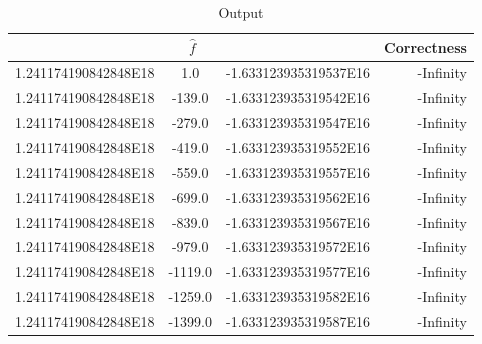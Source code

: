 \documentclass{article}
\begin{document}
\begin{enumerate}
		\begin{table}[h]
				\caption{Output} 
				\centering
				\begin{tabular}{ ccc r}
					\hline
					\multicolumn{3}{c}{$\hat{f}$} & Correctness \\
					\hline
										{1.241174190842848E18} & {1.0} & {-1.633123935319537E16} & {-Infinity}\\
										{1.241174190842848E18} & {-139.0} & {-1.633123935319542E16} & {-Infinity}\\
										{1.241174190842848E18} & {-279.0} & {-1.633123935319547E16} & {-Infinity}\\
										{1.241174190842848E18} & {-419.0} & {-1.633123935319552E16} & {-Infinity}\\
										{1.241174190842848E18} & {-559.0} & {-1.633123935319557E16} & {-Infinity}\\
										{1.241174190842848E18} & {-699.0} & {-1.633123935319562E16} & {-Infinity}\\
										{1.241174190842848E18} & {-839.0} & {-1.633123935319567E16} & {-Infinity}\\
										{1.241174190842848E18} & {-979.0} & {-1.633123935319572E16} & {-Infinity}\\
										{1.241174190842848E18} & {-1119.0} & {-1.633123935319577E16} & {-Infinity}\\
										{1.241174190842848E18} & {-1259.0} & {-1.633123935319582E16} & {-Infinity}\\
										{1.241174190842848E18} & {-1399.0} & {-1.633123935319587E16} & {-Infinity}\\
										\hline
				\end{tabular}
		\end{table}
\end{enumerate}
\hline
\end{document}
